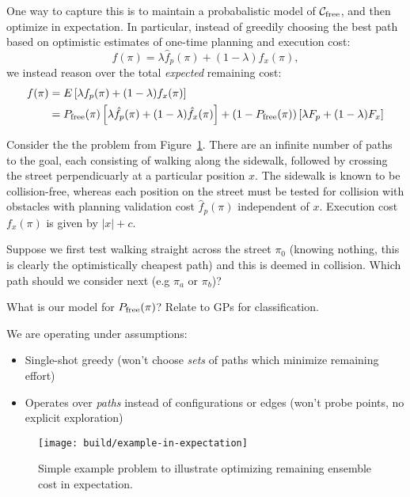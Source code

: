 {One way to capture this is to maintain a probabalistic model
of $\mathcal{C}_{\mbox{\scriptsize free}}$,
and then optimize in expectation.
In particular,
instead of greedily choosing the best path based on
optimistic estimates of one-time planning and execution cost:
\begin{equation}
   f(\pi) = \lambda \hat{f}_p(\pi) + (1-\lambda) \hat{f}_x(\pi),
\end{equation}
we instead reason over the total \emph{expected} remaining cost:
\begin{align}
   f(\pi)
      &= E \left[ \lambda f_p(\pi) + (1-\lambda) f_x(\pi) \right] \\
   &= P_{\mbox{\scriptsize free}}(\pi)
      \left[ \lambda \hat{f}_p(\pi) + (1-\lambda) \hat{f}_x(\pi) \right]
      + (1-P_{\mbox{\scriptsize free}}(\pi))
      \left[ \lambda F_p + (1-\lambda) F_x \right]
\end{align}

Consider the the problem from Figure~\ref{fig:example-in-expectation}.
There are an infinite number of paths to the goal,
each consisting of walking along the sidewalk,
followed by crossing the street perpendicuarly at a particular
position $x$.
The sidewalk is known to be collision-free,
whereas each position on the street must be tested for collision
with obstacles with planning validation cost $\hat{f}_p(\pi)$
independent of $x$.
Execution cost $f_x(\pi)$ is given by $|x|+c$.

Suppose we first test walking straight across the street $\pi_0$
(knowing nothing, this is clearly the optimistically cheapest path)
and this is deemed in collision.
Which path should we consider next (e.g $\pi_a$ or $\pi_b$)?

What is our model for $P_{\mbox{\scriptsize free}}(\pi)$?
Relate to GPs for classification\cite{rasmussen2006gpml}.

We are operating under assumptions:
\begin{itemize}
\item Single-shot greedy (won't choose \emph{sets} of paths
   which minimize remaining effort)
\item Operates over \emph{paths} instead of configurations
   or edges (won't probe points, no explicit exploration)
\end{itemize}

\begin{figure}
   \begin{center}
   \texttt{[image: build/example-in-expectation]}
   \end{center}
   \caption{Simple example problem to illustrate optimizing
      remaining ensemble cost in expectation.}
   \label{fig:example-in-expectation}
\end{figure}

}
